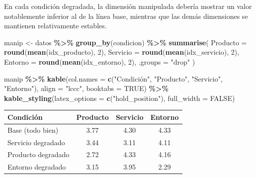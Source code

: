 \documentclass[
  spanish,
]{article}
\newenvironment{Shaded}{\begin{snugshade}}{\end{snugshade}}
\newcommand{\AttributeTok}[1]{\textcolor[rgb]{0.13,0.29,0.53}{#1}}
\newcommand{\ConstantTok}[1]{\textcolor[rgb]{0.56,0.35,0.01}{#1}}
\newcommand{\DecValTok}[1]{\textcolor[rgb]{0.00,0.00,0.81}{#1}}
\newcommand{\FunctionTok}[1]{\textcolor[rgb]{0.13,0.29,0.53}{\textbf{#1}}}
\newcommand{\NormalTok}[1]{#1}
\newcommand{\OtherTok}[1]{\textcolor[rgb]{0.56,0.35,0.01}{#1}}
\newcommand{\SpecialCharTok}[1]{\textcolor[rgb]{0.81,0.36,0.00}{\textbf{#1}}}
\newcommand{\StringTok}[1]{\textcolor[rgb]{0.31,0.60,0.02}{#1}}
\begin{document}
En cada condición degradada, la dimensión manipulada debería mostrar un
valor notablemente inferior al de la línea base, mientras que las demás
dimensiones se mantienen relativamente estables.

\begin{Shaded}
\begin{Highlighting}[]
\NormalTok{manip }\OtherTok{\textless{}{-}}\NormalTok{ datos }\SpecialCharTok{\%\textgreater{}\%}
  \FunctionTok{group\_by}\NormalTok{(condicion) }\SpecialCharTok{\%\textgreater{}\%}
  \FunctionTok{summarise}\NormalTok{(}
    \AttributeTok{Producto =} \FunctionTok{round}\NormalTok{(}\FunctionTok{mean}\NormalTok{(idx\_producto), }\DecValTok{2}\NormalTok{),}
    \AttributeTok{Servicio =} \FunctionTok{round}\NormalTok{(}\FunctionTok{mean}\NormalTok{(idx\_servicio), }\DecValTok{2}\NormalTok{),}
    \AttributeTok{Entorno  =} \FunctionTok{round}\NormalTok{(}\FunctionTok{mean}\NormalTok{(idx\_entorno), }\DecValTok{2}\NormalTok{),}
    \AttributeTok{.groups  =} \StringTok{"drop"}
\NormalTok{  )}

\NormalTok{manip }\SpecialCharTok{\%\textgreater{}\%}
  \FunctionTok{kable}\NormalTok{(}\AttributeTok{col.names =} \FunctionTok{c}\NormalTok{(}\StringTok{"Condición"}\NormalTok{, }\StringTok{"Producto"}\NormalTok{, }\StringTok{"Servicio"}\NormalTok{, }\StringTok{"Entorno"}\NormalTok{),}
        \AttributeTok{align    =} \StringTok{"lccc"}\NormalTok{,}
        \AttributeTok{booktabs =} \ConstantTok{TRUE}\NormalTok{) }\SpecialCharTok{\%\textgreater{}\%}
  \FunctionTok{kable\_styling}\NormalTok{(}\AttributeTok{latex\_options =} \FunctionTok{c}\NormalTok{(}\StringTok{"hold\_position"}\NormalTok{),}
                \AttributeTok{full\_width =} \ConstantTok{FALSE}\NormalTok{)}
\end{Highlighting}
\end{Shaded}

\begin{table}[!h]
\centering
\begin{tabular}{lccc}
\toprule
Condición & Producto & Servicio & Entorno\\
\midrule
Base (todo bien) & 3.77 & 4.30 & 4.33\\
Servicio degradado & 3.44 & 3.11 & 4.11\\
Producto degradado & 2.72 & 4.33 & 4.16\\
Entorno degradado & 3.15 & 3.95 & 2.29\\
\bottomrule
\end{tabular}
\end{table}
\end{document}
